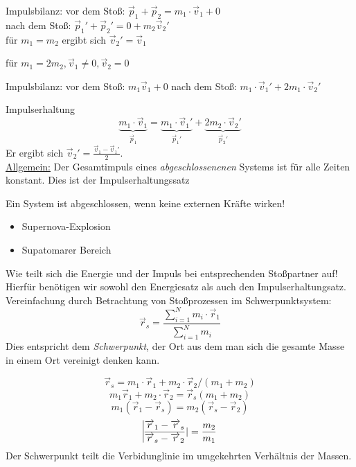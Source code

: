 \documentclass[a4paper,10pt]{scrartcl}
\begin{document}
\begin{seg}{Impulsbilanz:}
vor dem Stoß: $\vec p_1+\vec p_2=m_1\cdot \vec v_1+0$\\
nach dem Stoß: $\vec p_1'+ \vec p_2'=0+m_2\vec v_2'$\\
für $m_1=m_2$ ergibt sich $\vec v_2'=\vec v_1$
\end{seg}
für $m_1=2m_2, \vec v_1\neq 0, \vec v_2=0$
\begin{seg}{Impulsbilanz:}
 vor dem Stoß: $m_1\vec v_1+0$
nach dem Stoß: $m_1\cdot \vec v_1'+2m_1\cdot \vec v_2'$
\end{seg}
\begin{seg}{Impulserhaltung}
 \[
  \underbrace{m_1\cdot \vec v_1}_{\vec p_1}=\underbrace{m_1\cdot\vec v_1'}_{\vec p_1'}+\underbrace{2m_2\cdot \vec v_2'}_{\vec p_2'}
 \]
Er ergibt sich $\vec v_2'=\frac{\vec v_1-\vec v_1'}2$. \\
\underline{Allgemein:} Der Gesamtimpuls eines \emph{abgeschlossenenen} Systems ist für alle Zeiten konstant. Dies ist der Impulserhaltungssatz 
\end{seg}
\begin{note}
 Ein System ist abgeschlossen, wenn keine externen Kräfte wirken!
\end{note}
\begin{exs*}
 \begin{itemize}
  \item Supernova-Explosion
  \item Supatomarer Bereich
 \end{itemize}
\end{exs*}
 Wie teilt sich die Energie und der Impuls bei entsprechenden Stoßpartner auf! Hierfür benötigen wir sowohl den Energiesatz als auch den Impulserhaltungsatz.
Vereinfachung durch Betrachtung von Stoßprozessen im Schwerpunktsystem:\\
\fixme[Grafik]
\[
 \vec r_s=\frac{\sum_{i=1}^N m_i\cdot \vec r_1}{\sum_{i=1}^N m_i}
\]
Dies entspricht dem \emph{Schwerpunkt}, der Ort aus dem man sich die gesamte Masse in einem Ort vereinigt denken kann.
\begin{ex*}
\[
 \vec r_s=m_1\cdot \vec r_1+m_2\cdot \vec r_2/(m_1+m_2)
\]
\[
 m_1\vec r_1+m_2\cdot \vec r_2=\vec r_s(m_1+m_2)
\]
\[
 m_1(\vec r_1-\vec r_s)=m_2(\vec r_s-\vec r_2)
\]
\[
 \vline \frac{\vec r_1-\vec r_s}{\vec r_s-\vec r_2}|=\frac{m_2}{m_1}
\]
Der Schwerpunkt teilt die Verbidunglinie im umgekehrten Verhältnis der Massen.\\
\end{ex*}
\end{document}
